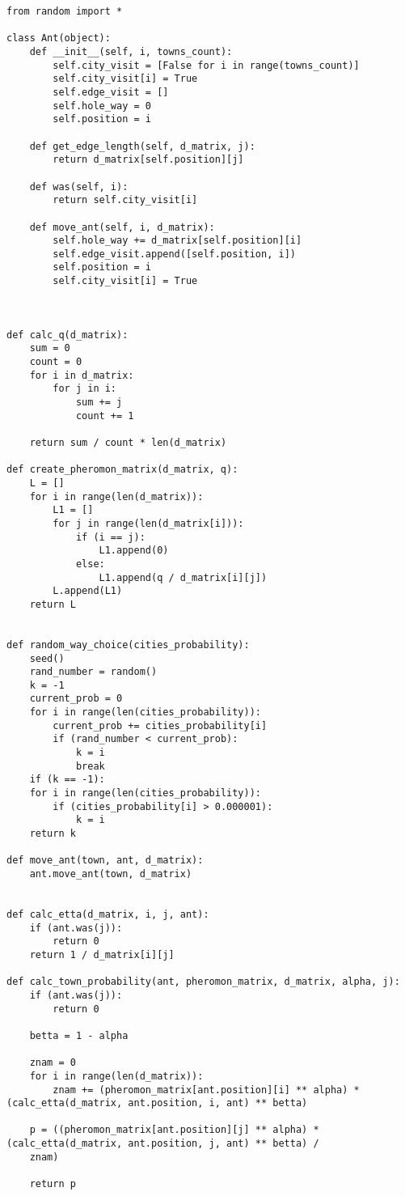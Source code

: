 \documentclass[a4paper,12pt]{article}
\begin{document}
\begin{lstlisting}[label=lst2,caption=Реализация муравьиного алгоритма для решения задачи коммивояжера]
from random import *

class Ant(object):
	def __init__(self, i, towns_count):
		self.city_visit = [False for i in range(towns_count)]
		self.city_visit[i] = True
		self.edge_visit = []
		self.hole_way = 0
		self.position = i
	
	def get_edge_length(self, d_matrix, j):
		return d_matrix[self.position][j]
	
	def was(self, i):
		return self.city_visit[i]
	
	def move_ant(self, i, d_matrix):
		self.hole_way += d_matrix[self.position][i]
		self.edge_visit.append([self.position, i])
		self.position = i
		self.city_visit[i] = True



def calc_q(d_matrix):
	sum = 0
	count = 0
	for i in d_matrix:
		for j in i:
			sum += j
			count += 1
	
	return sum / count * len(d_matrix)

def create_pheromon_matrix(d_matrix, q):
	L = []
	for i in range(len(d_matrix)):
		L1 = []
		for j in range(len(d_matrix[i])):
			if (i == j):
				L1.append(0)
			else:
				L1.append(q / d_matrix[i][j])
		L.append(L1)
	return L


def random_way_choice(cities_probability):
	seed()
	rand_number = random()
	k = -1
	current_prob = 0
	for i in range(len(cities_probability)):
		current_prob += cities_probability[i]
		if (rand_number < current_prob):
			k = i
			break
	if (k == -1):
	for i in range(len(cities_probability)):
		if (cities_probability[i] > 0.000001):
			k = i
	return k

def move_ant(town, ant, d_matrix):
	ant.move_ant(town, d_matrix)


def calc_etta(d_matrix, i, j, ant):
	if (ant.was(j)):
		return 0
	return 1 / d_matrix[i][j]
	
def calc_town_probability(ant, pheromon_matrix, d_matrix, alpha, j):
	if (ant.was(j)):
		return 0
	
	betta = 1 - alpha
	
	znam = 0
	for i in range(len(d_matrix)):
		znam += (pheromon_matrix[ant.position][i] ** alpha) * (calc_etta(d_matrix, ant.position, i, ant) ** betta)
	
	p = ((pheromon_matrix[ant.position][j] ** alpha) * (calc_etta(d_matrix, ant.position, j, ant) ** betta) /
	znam)
	
	return p




\end{lstlisting}
\end{document}

